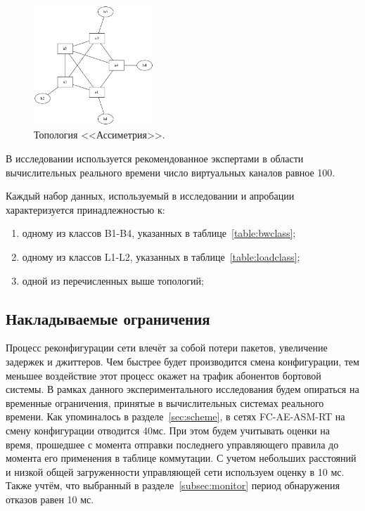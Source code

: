 \documentclass[12pt, a4paper]{article}
\begin{document}
\begin{figure}[h!]
	\centering
	\includegraphics[width=0.40\textwidth]{img/5node.png}
	\caption{Топология <<Ассиметрия>>.}
	\label{pic:5node}
\end{figure}

В исследовании используется рекомендованное экспертами в области вычислительных реального времени число виртуальных каналов равное 100.
\FloatBarrier

Каждый набор данных, используемый в исследовании и апробации характеризуется принадлежностью к:
\begin{enumerate}
	\item одному из классов B1-B4, указанных в таблице~\ref{table:bwclass};
	\item одному из классов L1-L2, указанных в таблице~\ref{table:loadclass};
	\item одной из перечисленных выше топологий;
\end{enumerate}



\subsection{Накладываемые ограничения} \label{subsec:limits}
Процесс реконфигурации сети влечёт за собой потери пакетов, увеличение задержек и джиттеров. Чем быстрее будет производится смена конфигурации, тем меньшее воздействие этот процесс окажет на трафик абонентов бортовой системы. В рамках данного экспериментального исследования будем опираться на временные ограничения, принятые в вычислительных системах реального времени. Как упоминалось в разделе~\ref{sec:scheme}, в сетях FC-AE-ASM-RT на смену конфигурации отводится 40мс. При этом будем учитывать оценки на время, прошедшее с момента отправки последнего управляющего правила до момента его применения в таблице коммутации. С учетом небольших расстояний и низкой общей загруженности управляющей сети используем оценку в 10 мс. Также учтём, что выбранный в разделе~\ref{subsec:monitor} период обнаружения отказов равен 10 мс.
\end{document}
